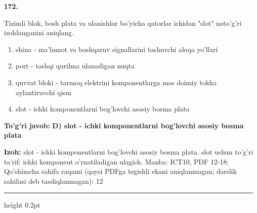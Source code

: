 \documentclass[10pt,a4paper]{article}
\begin{document}
{\bfseries\sffamily\color{ink} 172.}
\par
Tizimli blok, bosh plata va ulanishlar bo'yicha qatorlar ichidan "slot" noto'g'ri izohlanganini aniqlang.
\begin{enumerate}[label=\Alph*),leftmargin=9mm]
\item shina - ma'lumot va boshqaruv signallarini tashuvchi aloqa yo'llari
\item port - tashqi qurilma ulanadigan nuqta
\item quvvat bloki - tarmoq elektrini komponentlarga mos doimiy tokka aylantiruvchi qism
\item slot - ichki komponentlarni bog'lovchi asosiy bosma plata
\end{enumerate}
\begin{tcolorbox}[enhanced,breakable,colback=teal!4,colframe=teal!60!black,boxrule=0.45pt,arc=1.2mm,left=2.7mm,right=2.7mm,top=1.8mm,bottom=1.8mm,before skip=2mm,after skip=2mm]
{\bfseries\sffamily\color{teal}To'g'ri javob:} \textbf{D) slot - ichki komponentlarni bog'lovchi asosiy bosma plata}
\par\smallskip
{\bfseries Izoh:} slot - ichki komponentlarni bog'lovchi asosiy bosma plata. slot uchun to'g'ri ta'rif: ichki komponent o'rnatiladigan ulagich. Manba: ICT10, PDF 12-18; Qo'shimcha sahifa raqami (qaysi PDFga tegishli ekani aniqlanmagan; darslik sahifasi deb tasdiqlanmagan): 12
\end{tcolorbox}
\vspace{2mm}\hrule height 0.2pt\vspace{3mm}
\end{document}
